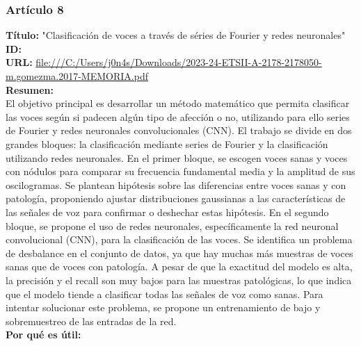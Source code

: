 \subsubsection*{Artículo 8}
\begin{flushleft}
    \textbf{Título:}
    "Clasificación de voces a través de séries de Fourier y redes neuronales"
    \\
    \textbf{ID: \cite{gomez2023clasificacion}}
    \\
    \textbf{URL:}
    \url{file:///C:/Users/j0n4s/Downloads/2023-24-ETSII-A-2178-2178050-m.gomezma.2017-MEMORIA.pdf}
    \\
    \textbf{Resumen:\\}
    El objetivo principal es desarrollar un método matemático que permita clasificar las voces según si padecen algún tipo de afección o no, utilizando para ello series de Fourier y redes neuronales convolucionales (CNN).
    El trabajo se divide en dos grandes bloques: la clasificación mediante series de Fourier y la clasificación utilizando redes neuronales. En el primer bloque, se escogen voces sanas y voces con nódulos para comparar su frecuencia fundamental media y la amplitud de sus oscilogramas. Se plantean hipótesis sobre las diferencias entre voces sanas y con patología, proponiendo ajustar distribuciones gaussianas a las características de las señales de voz para confirmar o deshechar estas hipótesis.
    En el segundo bloque, se propone el uso de redes neuronales, específicamente la red neuronal convolucional (CNN), para la clasificación de las voces. Se identifica un problema de desbalance en el conjunto de datos, ya que hay muchas más muestras de voces sanas que de voces con patología. A pesar de que la exactitud del modelo es alta, la precisión y el recall son muy bajos para las muestras patológicas, lo que indica que el modelo tiende a clasificar todas las señales de voz como sanas. Para intentar solucionar este problema, se propone un entrenamiento de bajo y sobremuestreo de las entradas de la red.
    \\
    \textbf{Por qué es útil:\\}
\end{flushleft}
